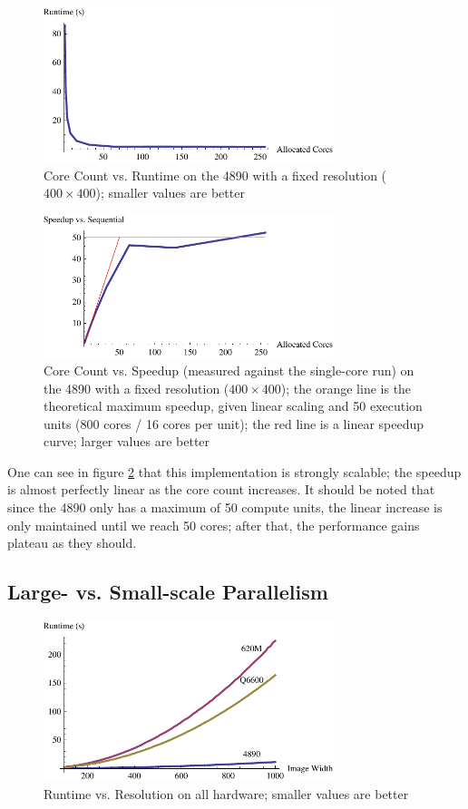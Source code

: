 \documentclass{acmsiggraph}
\begin{document}
\begin{figure}
    \includegraphics[width=84.5mm]{strongPlotOne.pdf}
    \caption{Core Count vs. Runtime on the 4890 with a fixed resolution ($400\times400$); smaller values are better}
    \label{fig:strongPlotOne}
\end{figure}

\begin{figure}
    \includegraphics[width=84.5mm]{strongPlotTwo.pdf}
    \caption{Core Count vs. Speedup (measured against the single-core run) on the 4890 with a fixed resolution ($400\times400$); the orange line is the theoretical maximum speedup, given linear scaling and 50 execution units (800 cores / 16 cores per unit); the red line is a linear speedup curve; larger values are better}
    \label{fig:strongPlotTwo}
\end{figure}

One can see in figure \ref{fig:strongPlotTwo} that this implementation is strongly scalable; the speedup is almost perfectly linear as the core count increases. It should be noted that since the 4890 only has a maximum of 50 compute units, the linear increase is only maintained until we reach 50 cores; after that, the performance gains plateau as they should.

\subsection{Large- vs. Small-scale Parallelism}

\begin{figure}
    \includegraphics[width=84.5mm]{runtimePlot.pdf}
    \caption{Runtime vs. Resolution on all hardware; smaller values are better}
    \label{fig:runtimePlot}
\end{figure}
\end{document}
